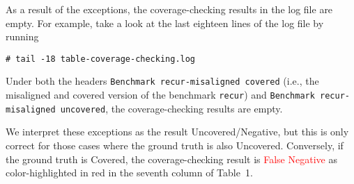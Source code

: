 As a result of the exceptions, the coverage-checking results in the log file are
empty.
%
For example, take a look at the last eighteen lines of the log file by running
\begin{verbatim}
# tail -18 table-coverage-checking.log
\end{verbatim}
%
Under both the headers \texttt{Benchmark recur-misaligned covered} (i.e., the
misaligned and covered version of the benchmark \texttt{recur}) and
\texttt{Benchmark recur-misaligned uncovered}, the coverage-checking results are
empty.

We interpret these exceptions as the result Uncovered/Negative, but this is only
correct for those cases where the ground truth is also Uncovered.
%
Conversely, if the ground truth is Covered, the coverage-checking result is
\textcolor{red}{False Negative} as color-highlighted in red in the seventh
column of Table~1.
